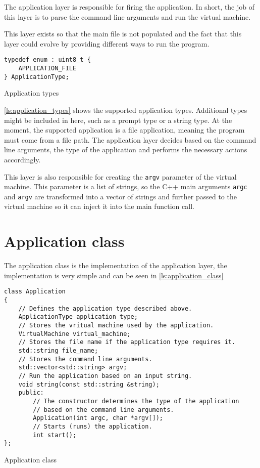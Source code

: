 The application layer is responsible for firing the application. In short, the job
of this layer is to parse the command line arguments and run the virtual machine.

This layer exists so that the main file is not populated and the fact that this layer could evolve by providing different ways to run
the program.

\begin{listing}[H]
\begin{verbatim}
typedef enum : uint8_t {
    APPLICATION_FILE
} ApplicationType;
\end{verbatim}
\caption{Application types}
\label{ls:application_types}
\end{listing}

\autoref{ls:application_types} shows the supported application types. Additional types might be included in here, such as a prompt type or a string type.
At the moment, the supported application is a file application, meaning the program must come from a file path.
The application layer decides based on the command line arguments, the type of the application and performs the necessary actions accordingly.

This layer is also responsible for creating the \texttt{argv} parameter of the virtual machine. This parameter is a list of strings, so the C++ main arguments
\texttt{argc} and \texttt{argv} are transformed into a vector of strings and further passed to the virtual machine so it can inject it into the
main function call.

\section{Application class}

The application class is the implementation of the application layer, the implementation is very simple and can be seen in \autoref{ls:application_class}

\begin{listing}[H]
\begin{verbatim}
class Application
{
    // Defines the application type described above.
    ApplicationType application_type;
    // Stores the vritual machine used by the application.
    VirtualMachine virtual_machine;
    // Stores the file name if the application type requires it.
    std::string file_name;
    // Stores the command line arguments.
    std::vector<std::string> argv;
    // Run the application based on an input string.
    void string(const std::string &string);
    public:
        // The constructor determines the type of the application
        // based on the command line arguments.
        Application(int argc, char *argv[]);
        // Starts (runs) the application.
        int start();
};
\end{verbatim}
\caption{Application class}
\label{ls:application_class}
\end{listing}
